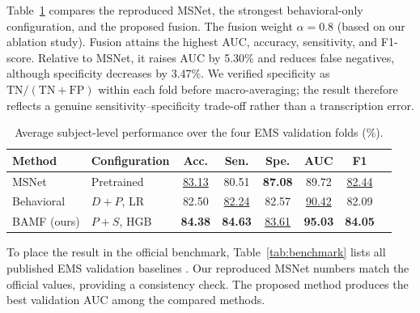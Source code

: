 \documentclass[conference,a4paper]{IEEEtran}
\begin{document}
Table~\ref{tab:main_results} compares the reproduced MSNet, the strongest behavioral-only configuration, and the proposed fusion. The fusion weight $\alpha = 0.8$ (based on our ablation study). Fusion attains the highest AUC, accuracy, sensitivity, and F1-score. Relative to MSNet, it raises AUC by 5.30\% and reduces false negatives, although specificity decreases by 3.47\%. We verified specificity as $\mathrm{TN}/(\mathrm{TN}+\mathrm{FP})$ within each fold before macro-averaging; the result therefore reflects a genuine sensitivity--specificity trade-off rather than a transcription error.

\begin{table}[t]
\caption{Average subject-level performance over the four EMS validation folds (\%).}
\label{tab:main_results}
\centering
\small
\setlength{\tabcolsep}{5pt}
\begin{tabular}{llcccccc}
\toprule
Method & Configuration & Acc. & Sen. & Spe. & AUC &  F1 \\
\midrule
MSNet & Pretrained & \underline{83.13} & 80.51 & \textbf{87.08} & 89.72 & \underline{82.44} \\
Behavioral & $D+P$, LR & 82.50 & \underline{82.24} & 82.57 & \underline{90.42} &  82.09 \\
BAMF (ours) & $P+S$, HGB & \textbf{84.38} & \textbf{84.63} & \underline{83.61} & \textbf{95.03} &  \textbf{84.05} \\
\bottomrule
\end{tabular}
\end{table}

To place the result in the official benchmark, Table~\ref{tab:benchmark} lists all published EMS validation baselines \cite{song2024ems}. Our reproduced MSNet numbers match the official values, providing a consistency check. The proposed method produces the best validation AUC among the compared methods. 
\end{document}
